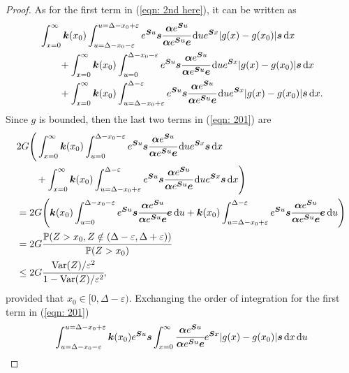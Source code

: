 \begin{proof}
	As for the first term in (\ref{eqn: 2nd here}), it can be written as 
	\begin{align}
		&\int_{x=0}^\infty \boldsymbol k(x_0)\int_{u=\Delta-x_0-\varepsilon}^{u=\Delta-x_0+\varepsilon} e^{\boldsymbol Su}\boldsymbol s \cfrac{\boldsymbol \alpha e^{\boldsymbol Su}}{\boldsymbol \alpha e^{\boldsymbol Su}\boldsymbol e} \, \mathrm{d} u e^{\boldsymbol Sx}|g(x) - g(x_0)|\boldsymbol s\, \mathrm{d} x \nonumber
		\\&\qquad{}+\int_{x=0}^\infty \boldsymbol k(x_0)\int_{u=0}^{\Delta-x_0-\varepsilon} e^{\boldsymbol Su}\boldsymbol s \cfrac{\boldsymbol \alpha e^{\boldsymbol Su}}{\boldsymbol \alpha e^{\boldsymbol Su}\boldsymbol e} \, \mathrm{d} u e^{\boldsymbol Sx}|g(x) - g(x_0)|\boldsymbol s\, \mathrm{d} x \nonumber
		\\&\qquad{}+\int_{x=0}^\infty \boldsymbol k(x_0)\int_{u=\Delta-x_0+\varepsilon}^{\Delta-\varepsilon} e^{\boldsymbol Su}\boldsymbol s \cfrac{\boldsymbol \alpha e^{\boldsymbol Su}}{\boldsymbol \alpha e^{\boldsymbol Su}\boldsymbol e} \, \mathrm{d} u e^{\boldsymbol Sx}|g(x) - g(x_0)|\boldsymbol s\, \mathrm{d} x. \label{eqn: 201}
	\end{align}
	Since \(g\) is bounded, then the last two terms in (\ref{eqn: 201}) are 
	\begin{align}
		&2G\Bigg(\int_{x=0}^\infty \boldsymbol k(x_0)\int_{u=0}^{\Delta-x_0-\varepsilon} e^{\boldsymbol Su}\boldsymbol s \cfrac{\boldsymbol \alpha e^{\boldsymbol Su}}{\boldsymbol \alpha e^{\boldsymbol Su}\boldsymbol e} \, \mathrm{d} u e^{\boldsymbol Sx}\boldsymbol s\, \mathrm{d} x \nonumber
		\\&\qquad{}+\int_{x=0}^\infty \boldsymbol k(x_0)\int_{u=\Delta-x_0+\varepsilon}^{\Delta-\varepsilon} e^{\boldsymbol Su}\boldsymbol s \cfrac{\boldsymbol \alpha e^{\boldsymbol Su}}{\boldsymbol \alpha e^{\boldsymbol Su}\boldsymbol e} \, \mathrm{d} u e^{\boldsymbol Sx}\boldsymbol s\, \mathrm{d} x\Bigg) \nonumber 
		\\&=2G\Bigg(\boldsymbol k(x_0)\int_{u=0}^{\Delta-x_0-\varepsilon} e^{\boldsymbol Su}\boldsymbol s \cfrac{\boldsymbol \alpha e^{\boldsymbol Su}}{\boldsymbol \alpha e^{\boldsymbol Su}\boldsymbol e}  \boldsymbol e  \, \mathrm{d} u\nonumber
		+ \boldsymbol k(x_0)\int_{u=\Delta-x_0+\varepsilon}^{\Delta-\varepsilon} e^{\boldsymbol Su}\boldsymbol s \cfrac{\boldsymbol \alpha e^{\boldsymbol Su}}{\boldsymbol \alpha e^{\boldsymbol Su}\boldsymbol e} \boldsymbol e\, \mathrm{d} u \Bigg) \nonumber
		\\&=2G \cfrac{\mathbb P(Z>x_0, Z\notin(\Delta-\varepsilon, \Delta+\varepsilon))}{\mathbb P(Z>x_0)}  \nonumber 
		\\&\leq 2G\cfrac{\mathrm{Var}(Z)/\varepsilon^2}{1-\mathrm{Var}(Z)/\varepsilon^2},
	\end{align}
	provided that \(x_0\in[0,\Delta-\varepsilon)\). 
	Exchanging the order of integration for the first term in (\ref{eqn: 201})
	\begin{align}
		\int_{u=\Delta-x_0-\varepsilon}^{u=\Delta-x_0+\varepsilon} \bs k(x_0) e^{\bs Su}\bs s\int_{x=0}^\infty \cfrac{\bs \alpha e^{\bs Su}}{\bs \alpha e^{\bs Su}\bs e} e^{\bs Sx}|g(x)-g(x_0)|\bs s\wrt x \wrt u \label{eqn: fdk13897}

\end{align}
\end{proof}
